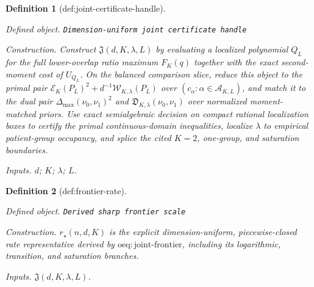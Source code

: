 \documentclass{article}
\newtheorem{definition}{Definition}
\begin{document}
\begin{definition}[def:joint-certificate-handle]\label{def:joint-certificate-handle}
\par\smallskip\noindent\emph{Defined object.} \texttt{Dimension-\allowbreak{}uniform joint certificate handle}
\par\smallskip\noindent\emph{Construction.} Construct \(\mathfrak J(d,K,\lambda,L)\) by evaluating a localized polynomial \(Q_L\) for the full lower-overlap ratio maximum \(F_K(q)\) together with the exact second-moment cost of \(U_{Q_L}\). On the balanced comparison slice, reduce this object to the primal pair \(\mathcal E_K(P_L)^2+d^{-1}\mathcal W_{K,\lambda}(P_L)\) over \((c_\alpha:\alpha\in\mathcal A_{K,L})\), and match it to the dual pair \(\Delta_{\max}(\nu_0,\nu_1)^2\) and \(\mathfrak D_{K,\lambda}(\nu_0,\nu_1)\) over normalized moment-matched priors. Use exact semialgebraic decision on compact rational localization boxes to certify the primal continuous-domain inequalities, localize \(\lambda\) to empirical patient-group occupancy, and splice the cited \(K=2\), one-group, and saturation boundaries.
\par\smallskip\noindent\emph{Inputs.} \(d\); \(K\); \(\lambda\); \(L\).
\end{definition}

\begin{definition}[def:frontier-rate]\label{def:frontier-rate}
\par\smallskip\noindent\emph{Defined object.} \texttt{Derived sharp frontier scale}
\par\smallskip\noindent\emph{Construction.} \(r_\star(n,d,K)\) is the explicit dimension-uniform, piecewise-closed rate representative derived by \(\mathrm{oeq{:}joint\text{-}frontier}\), including its logarithmic, transition, and saturation branches.
\par\smallskip\noindent\emph{Inputs.} \(\mathfrak J(d,K,\lambda,L)\).
\end{definition}
\end{document}
